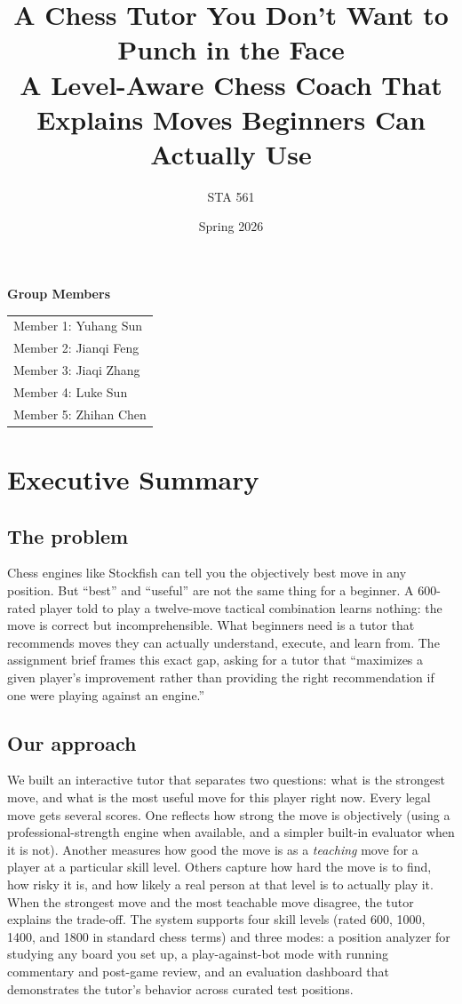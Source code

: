 \documentclass[11pt]{article}
\title{\textbf{A Chess Tutor You Don't Want to Punch in the Face}\\
       \large A Level-Aware Chess Coach That Explains Moves Beginners Can Actually Use}
\author{STA 561}
\date{Spring 2026}
\begin{document}
\maketitle

{\Large \textbf{Group Members}}\\[0.3cm]
\begin{tabular}{l}
Member 1: Yuhang Sun \\
Member 2: Jianqi Feng \\
Member 3: Jiaqi Zhang \\
Member 4: Luke Sun \\
Member 5: Zhihan Chen \\
\end{tabular}

\section*{Executive Summary}

\subsection*{The problem}
Chess engines like Stockfish can tell you the objectively best move in any position. But ``best'' and ``useful'' are not the same thing for a beginner. A 600-rated player told to play a twelve-move tactical combination learns nothing: the move is correct but incomprehensible. What beginners need is a tutor that recommends moves they can actually understand, execute, and learn from. The assignment brief frames this exact gap, asking for a tutor that ``maximizes a given player's improvement rather than providing the right recommendation if one were playing against an engine.''

\subsection*{Our approach}
We built an interactive tutor that separates two questions: what is the strongest move, and what is the most useful move for this player right now. Every legal move gets several scores. One reflects how strong the move is objectively (using a professional-strength engine when available, and a simpler built-in evaluator when it is not). Another measures how good the move is as a \emph{teaching} move for a player at a particular skill level. Others capture how hard the move is to find, how risky it is, and how likely a real person at that level is to actually play it. When the strongest move and the most teachable move disagree, the tutor explains the trade-off. The system supports four skill levels (rated 600, 1000, 1400, and 1800 in standard chess terms) and three modes: a position analyzer for studying any board you set up, a play-against-bot mode with running commentary and post-game review, and an evaluation dashboard that demonstrates the tutor's behavior across curated test positions.
\end{document}
